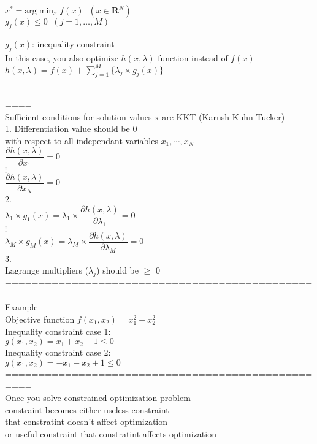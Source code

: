 \documentclass{article}
\begin{document}
$x^{\ast} = \text{arg} \min_x f(x)  \;\; (x \in \mathbf{R}^N)$ \\  
$g_j(x) \leq 0 \;\; (j=1, \ldots, M)$

$g_j(x)$: inequality constraint \\ 

In this case, you also optimize $h(x,\lambda)$ function instead of $f(x)$ \\ 

$h(x, \lambda) = f(x) + \sum\limits_{j=1}^M \{\lambda_j \times g_j(x)\}$

==================================================\\
Sufficient conditions for solution values x are KKT (Karush-Kuhn-Tucker) \\ 

1. Differentiation value should be 0 \\ 
with respect to all independant variables $x_1,\cdots,x_N$ \\ 
$\dfrac{\partial h(x, \lambda)}{\partial x_1} = 0$ \\ 
$\vdots$ \\ 
$\dfrac{\partial h(x, \lambda)}{\partial x_N} = 0$ \\ 

2. \\
$\lambda_1 \times g_1(x) = \lambda_1 \times \dfrac{\partial h(x,\lambda)}{\partial \lambda_1} = 0$ \\ 
$\vdots$ \\ 
$\lambda_M \times g_M(x) = \lambda_M \times \dfrac{\partial h(x,\lambda)}{\partial \lambda_M} = 0$ \\ 

3. \\
Lagrange multipliers ($\lambda_j$) should be $\ge$ 0 \\ 

==================================================\\
Example \\ 

Objective function $f(x_1,x_2)=x_1^2+x_2^2$ \\ 

Inequality constraint case 1: \\ 
$g(x_1,x_2)=x_1+x_2-1 \le 0$ \\ 

Inequality constraint case 2: \\ 
$g(x_1,x_2)=-x_1-x_2+1 \le 0$ \\ 

==================================================\\

Once you solve constrained optimization problem \\ 
constraint becomes either useless constraint\\
that constratint doesn't affect optimization\\
or useful constraint that constratint affects optimization\\
\end{document}
